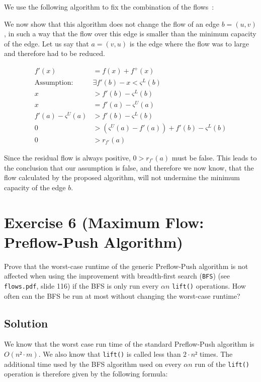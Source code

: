 \documentclass[a4paper, 12pt]{report}
\begin{document}
We use the following algorithm to fix the combination of the
flows~\cite{Informatik_Forum_Combine_Flows}:

\begin{leftbar}
    
\end{leftbar}

We now show that this algorithm does not change the flow of an edge $b=(u,v)$,
in such a way that the flow over this edge is smaller than the minimum capacity
of the edge. Let us say that $a=(v,u)$ is the edge where the flow was to large
and therefore had to be reduced.

\begin{align*}
    f'(x) &= f(x) + f^+(x)\\[10pt]
    \text{Assumption: } &∃ f'(b) - x < ς^L(b)\\[10pt]
    x &> f'(b) - ς^L(b)\\
    x &= f'(a) - ς^U(a)\\
    f'(a) - ς^U(a) &> f'(b) - ς^L(b)\\
    0 &> (ς^U(a) - f'(a)) + f'(b) - ς^L(b)\\
    0 &> r_{f'}(a)
\end{align*}

Since the residual flow is always positive, $0 > r_{f'}(a)$ must be false. This
leads to the conclusion that our assumption is false, and therefore we now
know, that the flow calculated by the proposed algorithm, will not undermine
the minimum capacity of the edge $b$.

\section{Exercise 6 (Maximum Flow: Preflow-Push Algorithm)}

Prove that the worst-case runtime of the generic Preflow-Push algorithm is not
affected when using the improvement with breadth-first search (\texttt{BFS})
(see \texttt{flows.pdf}, slide 116) if the BFS is only run every $αn$
\texttt{lift()} operations. How often can the BFS be run at most without
changing the worst-case runtime?

\subsection{Solution}

We know that the worst case run time of the standard Preflow-Push algorithm is
$O(n² · m)$. We also know that \texttt{lift()} is called less than $2·n²$
times. The additional time used by the BFS algorithm used on every $αn$ run of
the \texttt{lift()} operation is therefore given by the following formula:
\end{document}
